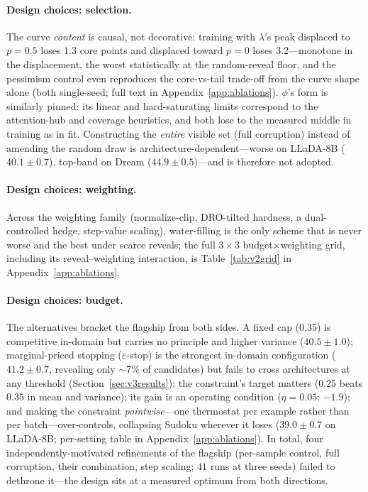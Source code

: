\documentclass{article} %
\begin{document}
\paragraph{Design choices: selection.} The curve \emph{content} is causal, not decorative: training with $\lambda$'s peak displaced to $p{=}0.5$ loses $1.3$ core points and displaced toward $p{=}0$ loses $3.2$---monotone in the displacement, the worst statistically at the random-reveal floor, and the pessimism control even reproduces the core-vs-tail trade-off from the curve shape alone (both single-seed; full text in Appendix~\ref{app:ablations}). $\phi$'s form is similarly pinned: its linear and hard-saturating limits correspond to the attention-hub and coverage heuristics, and both lose to the measured middle in training as in fit. Constructing the \emph{entire} visible set (full corruption) instead of amending the random draw is architecture-dependent---worse on LLaDA-8B ($40.1 \pm 0.7$), top-band on Dream ($44.9 \pm 0.5$)---and is therefore not adopted.

\paragraph{Design choices: weighting.} Across the weighting family (normalize-clip, DRO-tilted hardness, a dual-controlled hedge, step-value scaling), water-filling is the only scheme that is never worse and the best under scarce reveals; the full $3\times3$ budget$\times$weighting grid, including its reveal--weighting interaction, is Table~\ref{tab:v2grid} in Appendix~\ref{app:ablations}.

\paragraph{Design choices: budget.} The alternatives bracket the flagship from both sides. A fixed cap ($0.35$) is competitive in-domain but carries no principle and higher variance ($40.5 \pm 1.0$); marginal-priced stopping ($\varepsilon$-stop) is the strongest in-domain configuration ($41.2 \pm 0.7$, revealing only $\sim$7\% of candidates) but fails to cross architectures at any threshold (Section~\ref{sec:v3results}); the constraint's target matters ($0.25$ beats $0.35$ in mean and variance); its gain is an operating condition ($\eta{=}0.05$: $-1.9$); and making the constraint \emph{pointwise}---one thermostat per example rather than per batch---over-controls, collapsing Sudoku wherever it loses ($39.0 \pm 0.7$ on LLaDA-8B; per-setting table in Appendix~\ref{app:ablations}). In total, four independently-motivated refinements of the flagship (per-sample control, full corruption, their combination, step scaling; $41$ runs at three seeds) failed to dethrone it---the design sits at a measured optimum from both directions.
\end{document}
